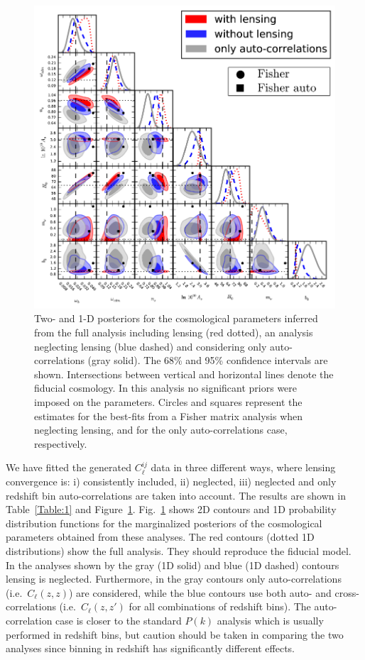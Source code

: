 \begin{figure}[bthp]
  \centering
  \includegraphics[width=\textwidth]{figures/chapter-mnu/triangle_figure_MCDM_bias_w_legend.pdf}
  \caption{Two- and 1-D posteriors for the cosmological parameters inferred from the full analysis including lensing (red dotted), an analysis neglecting lensing (blue dashed) and considering only auto-correlations (gray solid).
    The 68\% and 95\% confidence intervals are shown.
    Intersections between vertical and horizontal lines denote the fiducial cosmology.
   In this analysis no significant priors were imposed on the parameters.  Circles and squares represent the estimates for the best-fits from a Fisher matrix analysis when neglecting lensing, and for the only auto-correlations case, respectively.
  }
  \label{fig:mcmc}
\end{figure}

We have  fitted the generated $C_\ell^{ij}$ data in three different ways,  where lensing convergence is: i) consistently included, ii) neglected, iii) neglected and only redshift bin auto-correlations are taken into account. The results are shown in Table~\ref{Table:1} and Figure~\ref{fig:mcmc}. Fig.~\ref{fig:mcmc} shows 2D contours and 1D probability distribution functions for the marginalized posteriors of the cosmological parameters obtained from these analyses. The red contours (dotted 1D distributions) show the full analysis. They should reproduce the fiducial model. In the analyses shown by the gray (1D solid) and blue (1D dashed) contours lensing is neglected. Furthermore, in the gray  contours only auto-correlations (i.e.\ $C_\ell(z,z)$) are considered, while the blue contours use both auto- and cross-correlations (i.e.\ $C_\ell(z,z')$ for all combinations of redshift bins).
The auto-correlation case is closer to the standard $P(k)$ analysis which is usually performed in redshift bins, but caution should be taken in comparing the two analyses since binning in redshift has significantly different effects.


